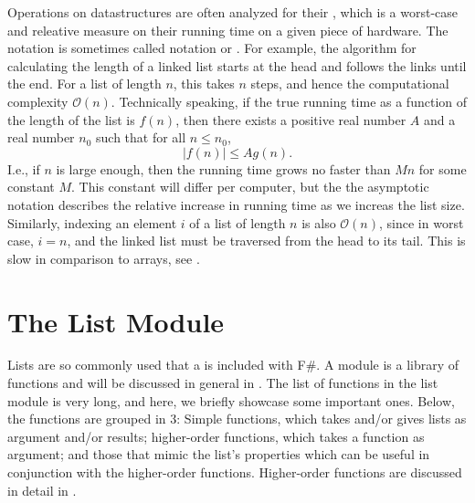 \documentclass[fsharpNotes.tex]{subfiles}
\begin{document}
Operations on datastructures are often analyzed for their , which is a worst-case and releative measure on their running time on a given piece of hardware. The notation is sometimes called  notation or . For example, the algorithm for calculating the length of a linked list starts at the head and follows the links until the end. For a list of length $n$, this takes $n$ steps, and hence the computational complexity $\mathcal{O}(n)$. Technically speaking, if the true running time as a function of the length of the list is $f(n)$, then there exists a positive real number $A$ and a real number $n_0$ such that for all $n\leq n_0$,
\begin{equation}
  |f(n)| \leq Ag(n).
\end{equation}
I.e., if $n$ is large enough, then the running time grows no faster than $Mn$ for some constant $M$. This constant will differ per computer, but the the asymptotic notation describes the relative increase in running time as we increas the list size. Similarly, indexing an element $i$ of a list of length $n$ is also $\mathcal{O}(n)$, since in worst case, $i=n$, and the linked list must be traversed from the head to its tail. This is slow in comparison to arrays, see .
 
\section{The List Module}
Lists are so commonly used that a  is included with F\#. A module is a library of functions and will be discussed in general in . The list of functions in the list module is very long, and here, we briefly showcase some important ones. Below, the functions are grouped in 3: Simple functions, which takes and/or gives lists as argument and/or results; higher-order functions, which takes a function as argument; and those that mimic the list's properties which can be useful in conjunction with the higher-order functions. Higher-order functions are discussed in detail in .
\end{document}
